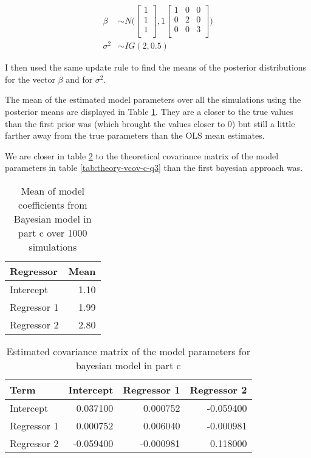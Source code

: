\documentclass[]{book}
\begin{document}
\begin{align}
  \beta &\sim N \bigg( 
  \begin{bmatrix}
  1\\
  1\\
  1\\
  \end{bmatrix},
  1 \begin{bmatrix}
  1 & 0 & 0\\
  0 & 2 & 0\\
  0 & 0 & 3\\
  \end{bmatrix} \bigg)\\
  \sigma^2 &\sim IG(2, 0.5)
\end{align}

I then used the same update rule to find the means of the posterior distributions for the vector \(\beta\) and for \(\sigma^2\).

The mean of the estimated model parameters over all the simulations using the posterior means are displayed in Table \ref{tab:bayes-c-mean-coefs-q3}. They are a closer to the true values than the first prior was (which brought the values closer to 0) but still a little farther away from the true parameters than the OLS mean estimates.

We are closer in table \ref{tab:bayes-c-est-vcov-q3} to the theoretical covariance matrix of the model parameters in table \ref{tab:theory-vcov-c-q3} than the first bayesian approach was.

\begin{table}

\caption{\label{tab:bayes-c-mean-coefs-q3}Mean of model coefficients from Bayesian model in part c over 1000 simulations}
\centering
\begin{tabular}[t]{lr}
\toprule
Regressor & Mean\\
\midrule
Intercept & 1.10\\
Regressor 1 & 1.99\\
Regressor 2 & 2.80\\
\bottomrule
\end{tabular}
\end{table}

\begin{table}

\caption{\label{tab:bayes-c-est-vcov-q3}Estimated covariance matrix of the model parameters for bayesian model in part c}
\centering
\begin{tabular}[t]{lrrr}
\toprule
Term & Intercept & Regressor 1 & Regressor 2\\
\midrule
Intercept & 0.037100 & 0.000752 & -0.059400\\
Regressor 1 & 0.000752 & 0.006040 & -0.000981\\
Regressor 2 & -0.059400 & -0.000981 & 0.118000\\
\bottomrule
\end{tabular}
\end{table}
\end{document}
